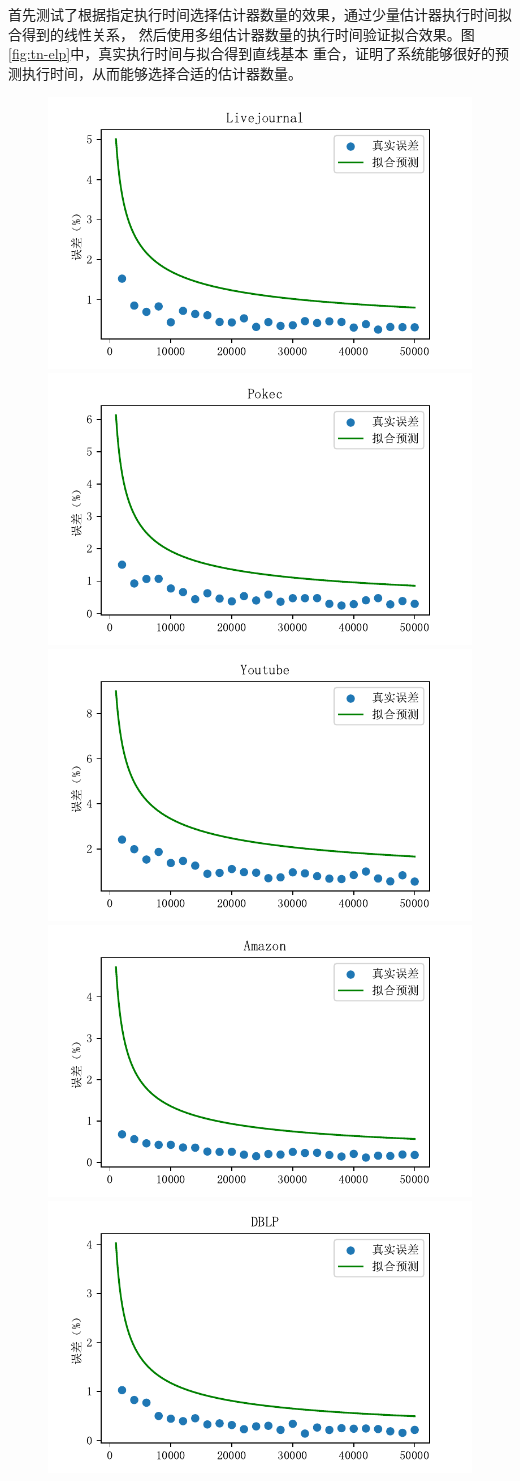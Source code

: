\documentclass[master]{thesis-uestc}
\begin{document}
    首先测试了根据指定执行时间选择估计器数量的效果，通过少量估计器执行时间拟合得到的线性关系，
然后使用多组估计器数量的执行时间验证拟合效果。图\ref{fig:tn-elp}中，真实执行时间与拟合得到直线基本
重合，证明了系统能够很好的预测执行时间，从而能够选择合适的估计器数量。

\begin{figure}
    \includegraphics[width=0.5\linewidth]{pic/en/LiveJournal.pdf}%
    \includegraphics[width=0.5\linewidth]{pic/en/Pokec.pdf}\\
    \includegraphics[width=0.5\linewidth]{pic/en/Youtube.pdf}%
    \includegraphics[width=0.5\linewidth]{pic/en/Amazon.pdf}\\
    \includegraphics[width=0.5\linewidth]{pic/en/DBLP.pdf}%

\end{figure}
\end{document}

